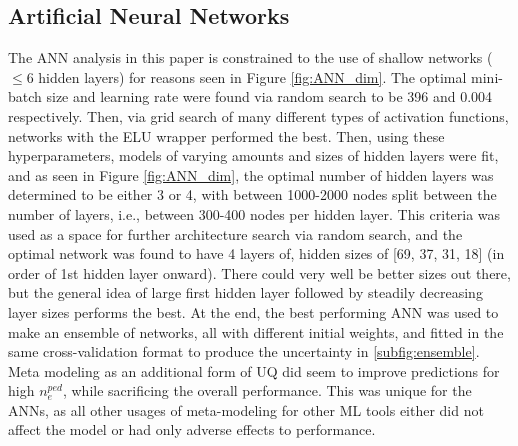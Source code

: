 \documentclass[a4paper, twoside, final, 12pt]{article}
\begin{document}
{\subsection{Artificial Neural Networks}
The ANN analysis in this paper is constrained to the use of shallow networks ($\leq 6$ hidden layers) for reasons seen in Figure \ref{fig:ANN_dim}. The optimal mini-batch size and learning rate were found via random search to be 396 and 0.004 respectively. Then, via grid search of many different types of activation functions, networks with the ELU wrapper performed the best. Then, using these hyperparameters, models of varying amounts and sizes of hidden layers were fit, and as seen in Figure \ref{fig:ANN_dim}, the optimal number of hidden layers was determined to be either 3 or 4, with between 1000-2000 nodes split between the number of layers, i.e., between 300-400 nodes per hidden layer. This criteria was used as a space for further architecture search via random search, and the optimal network was found to have 4 layers of, hidden sizes of [69, 37, 31, 18] (in order of 1st hidden layer onward). 
There could very well be better sizes out there, but the general idea of large first hidden layer followed by steadily decreasing layer sizes performs the best.
At the end, the best performing ANN was used to make an ensemble of networks, all with different initial weights, and fitted in the same cross-validation format to produce the uncertainty in \ref{subfig:ensemble}.
Meta modeling as an additional form of UQ did seem to improve predictions for high $n_e^{ped}$, while sacrificing the overall performance.
This was unique for the ANNs, as all other usages of meta-modeling for other ML tools either did not affect the model or had only adverse effects to performance.

}
\end{document}
